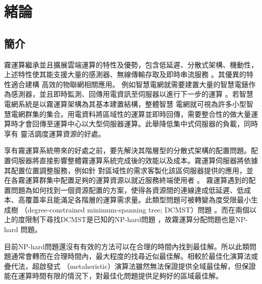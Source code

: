 \chapter{緒論}
\label{chapter:intro}
\section{簡介}

霧運算繼承並且擴展雲端運算的特性及優勢，包含低延遲、分散式架構、機動性，上述特性使其能支援大量的感測器、無線傳輸存取及即時串流服務 \cite{bonomi_2012}。其優異的特性適合建構
高效的物聯網相關應用。
例如智慧電網就需要建置大量的智慧電錶作為感測器，並且即時監測、回傳用電資訊至伺服器以進行下一步的運算 \cite{yi_2015}。若智慧電網系統是以霧運算架構為其基本建置結構，整體智慧
電網就可視為許多小型智慧電網群集的集合。用電資料將區域性的運算並即時回傳，需要整合性的做大量運算時才會回傳至運算中心以大型伺服器運算。此舉降低集中式伺服器的負載，同時享有
靈活調度運算資源的好處。

享有霧運算系統帶來的好處之前，要先解決其階層型的分散式架構的配置問題。配置伺服器將直接影響整體霧運算系統完成後的效能以及成本。霧運算伺服器將依據其配置位置調整服務，例如針
對區域性的需求客製化該區伺服器提供的應用，並在各霧運算群集中配置足夠的運算資源以就近服務終端使用者 \cite{luan_2015}。
霧運算遇到的配置問題為如何找到一個資源配置的方案，使得各資源間的連線達成低延遲、低成本、高覆蓋率且能滿足各階層的運算需求量。此類型問題可被轉變為度受限最小生成樹
（degree-constrained minimum-spanning tree; DCMST）問題 \cite{kim_2015}。而在兩個以上的度限制下尋找DCMST是已知的NP-hard問題 \cite{narula_1980}，故霧運算分配問題也是NP-hard
問題。

目前NP-hard問題還沒有有效的方法可以在合理的時間內找到最佳解。所以此類問題通常會轉而在合理時間內，最大程度的找尋近似最佳解。相較於最佳化演算法或疊代法，超啟發式
（metaheristic）演算法雖然無法保證提供全域最佳解，但保證能在運算時間有限的情況下，對最佳化問題提供足夠好的區域最佳解。
\\
\\

